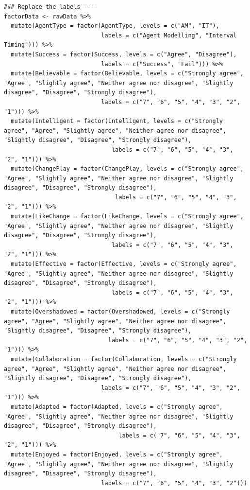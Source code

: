 \documentclass{IEEEtran}
\begin{document}
\begin{verbatim}
### Replace the labels ----
factorData <- rawData %>%
  mutate(AgentType = factor(AgentType, levels = c("AM", "IT"),
                            labels = c("Agent Modelling", "Interval Timing"))) %>%
  mutate(Success = factor(Success, levels = c("Agree", "Disagree"),
                            labels = c("Success", "Fail"))) %>%
  mutate(Believable = factor(Believable, levels = c("Strongly agree", "Agree", "Slightly agree", "Neither agree nor disagree", "Slightly disagree", "Disagree", "Strongly disagree"),
                            labels = c("7", "6", "5", "4", "3", "2", "1"))) %>%
  mutate(Intelligent = factor(Intelligent, levels = c("Strongly agree", "Agree", "Slightly agree", "Neither agree nor disagree", "Slightly disagree", "Disagree", "Strongly disagree"),
                               labels = c("7", "6", "5", "4", "3", "2", "1"))) %>%
  mutate(ChangePlay = factor(ChangePlay, levels = c("Strongly agree", "Agree", "Slightly agree", "Neither agree nor disagree", "Slightly disagree", "Disagree", "Strongly disagree"),
                                labels = c("7", "6", "5", "4", "3", "2", "1"))) %>%
  mutate(LikeChange = factor(LikeChange, levels = c("Strongly agree", "Agree", "Slightly agree", "Neither agree nor disagree", "Slightly disagree", "Disagree", "Strongly disagree"),
                               labels = c("7", "6", "5", "4", "3", "2", "1"))) %>%
  mutate(Effective = factor(Effective, levels = c("Strongly agree", "Agree", "Slightly agree", "Neither agree nor disagree", "Slightly disagree", "Disagree", "Strongly disagree"),
                               labels = c("7", "6", "5", "4", "3", "2", "1"))) %>%
  mutate(Overshadowed = factor(Overshadowed, levels = c("Strongly agree", "Agree", "Slightly agree", "Neither agree nor disagree", "Slightly disagree", "Disagree", "Strongly disagree"),
                              labels = c("7", "6", "5", "4", "3", "2", "1"))) %>%
  mutate(Collaboration = factor(Collaboration, levels = c("Strongly agree", "Agree", "Slightly agree", "Neither agree nor disagree", "Slightly disagree", "Disagree", "Strongly disagree"),
                            labels = c("7", "6", "5", "4", "3", "2", "1"))) %>%
  mutate(Adapted = factor(Adapted, levels = c("Strongly agree", "Agree", "Slightly agree", "Neither agree nor disagree", "Slightly disagree", "Disagree", "Strongly disagree"),
                                 labels = c("7", "6", "5", "4", "3", "2", "1"))) %>%
  mutate(Enjoyed = factor(Enjoyed, levels = c("Strongly agree", "Agree", "Slightly agree", "Neither agree nor disagree", "Slightly disagree", "Disagree", "Strongly disagree"),
                            labels = c("7", "6", "5", "4", "3", "2")))


\end{verbatim}
\end{document}
